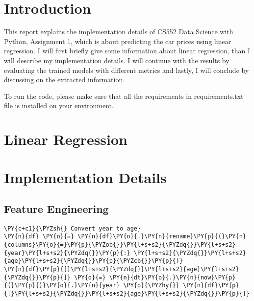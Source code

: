 \section*{Introduction}

This report explains the implementation details of CS552 Data Science with
Python, Assignment 1, which is about predicting the car prices using linear
regression. I will first briefly give some information about linear regression,
than I will describe my implementation details. I will continue with the results
by evaluating the trained models with different metrics and lastly, I will
conclude by discussing on the extracted information.

To run the code, please make sure that all the requirements in requirements.txt file is
installed on your environment.

\section*{Linear Regression}

 \lipsum[1-1]


\section*{Implementation Details}
\subsection*{Feature Engineering}

 \lipsum[1-1]

\begin{tcolorbox}[breakable, size=fbox, boxrule=1pt, pad at break*=1mm,colback=cellbackground, colframe=cellborder]
\begin{Verbatim}[commandchars=\\\{\}]
\PY{c+c1}{\PYZsh{} Convert year to age}
\PY{n}{df} \PY{o}{=} \PY{n}{df}\PY{o}{.}\PY{n}{rename}\PY{p}{(}\PY{n}{columns}\PY{o}{=}\PY{p}{\PYZob{}}\PY{l+s+s2}{\PYZdq{}}\PY{l+s+s2}{year}\PY{l+s+s2}{\PYZdq{}}\PY{p}{:} \PY{l+s+s2}{\PYZdq{}}\PY{l+s+s2}{age}\PY{l+s+s2}{\PYZdq{}}\PY{p}{\PYZcb{}}\PY{p}{)}
\PY{n}{df}\PY{p}{[}\PY{l+s+s2}{\PYZdq{}}\PY{l+s+s2}{age}\PY{l+s+s2}{\PYZdq{}}\PY{p}{]} \PY{o}{=} \PY{n}{dt}\PY{o}{.}\PY{n}{now}\PY{p}{(}\PY{p}{)}\PY{o}{.}\PY{n}{year} \PY{o}{\PYZhy{}} \PY{n}{df}\PY{p}{[}\PY{l+s+s2}{\PYZdq{}}\PY{l+s+s2}{age}\PY{l+s+s2}{\PYZdq{}}\PY{p}{]}
\end{Verbatim}
\end{tcolorbox}

